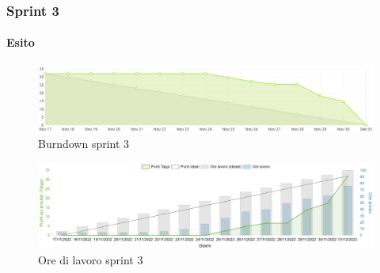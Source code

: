 \documentclass{beamer}
\begin{document}


\begin{frame}
  \frametitle{Sprint 3}
  \framesubtitle{Esito}

  \begin{figure}
    \centering
    \includegraphics[width=\textwidth]{../img/sprint3/burndown.png}
    \caption{Burndown sprint 3}
  \end{figure}
  \begin{figure}
    \centering
    \includegraphics[width=\textwidth]{../img/sprint3/worktime.png}
    \caption{Ore di lavoro sprint 3}
  \end{figure}
\end{frame}
\end{document}
